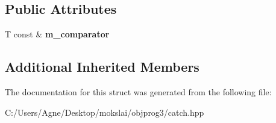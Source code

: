 \subsection*{Public Attributes}
\begin{DoxyCompactItemize}
\item 
\mbox{\label{struct_catch_1_1_matchers_1_1_vector_1_1_contains_element_matcher_ab7eada6c4bbce1d21b44773262f9cb23}} 
T const  \& {\bfseries m\+\_\+comparator}
\end{DoxyCompactItemize}
\subsection*{Additional Inherited Members}


The documentation for this struct was generated from the following file\+:\begin{DoxyCompactItemize}
\item 
C\+:/\+Users/\+Agne/\+Desktop/mokslai/objprog3/catch.\+hpp\end{DoxyCompactItemize}
